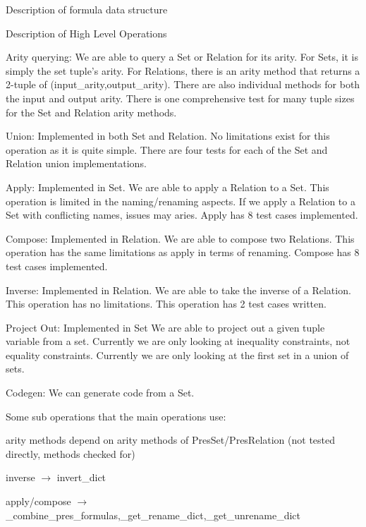 \documentclass[journal,10pt]{IEEEtran}
\begin{document}
\begin{section}{Description of formula data structure}
\end{section}

\begin{section}{Description of High Level Operations}

Arity querying: We are able to query a Set or Relation for its arity.
For Sets, it is simply the set tuple's arity.
For Relations, there is an arity method that returns a 2-tuple of (input\_arity,output\_arity).
There are also individual methods for both the input and output arity.
There is one comprehensive test for many tuple sizes for the Set and Relation arity methods.

Union: Implemented in both Set and Relation.
No limitations exist for this operation as it is quite simple.
There are four tests for each of the Set and Relation union implementations.

Apply: Implemented in Set.
We are able to apply a Relation to a Set.
This operation is limited in the naming/renaming aspects.
If we apply a Relation to a Set with conflicting names, issues may aries.
Apply has 8 test cases implemented.

Compose: Implemented in Relation.
We are able to compose two Relations.
This operation has the same limitations as apply in terms of renaming.
Compose has 8 test cases implemented.

Inverse: Implemented in Relation.
We are able to take the inverse of a Relation.
This operation has no limitations.
This operation has 2 test cases written.

Project Out: Implemented in Set
We are able to project out a given tuple variable from a set.
Currently we are only looking at inequality constraints, not equality constraints.
Currently we are only looking at the first set in a union of sets.

Codegen: We can generate code from a Set.

Some sub operations that the main operations use:

arity methods depend on arity methods of PresSet/PresRelation (not tested directly, methods checked for)

inverse $\rightarrow$ invert\_dict

apply/compose $\rightarrow$ \_combine\_pres\_formulas,\_get\_rename\_dict,\_get\_unrename\_dict

\end{section}
\end{document}
